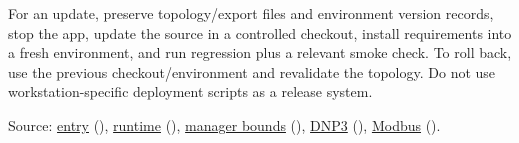 \par\noindent\begin{minipage}{\linewidth}\setlength{\parskip}{5pt}
For an update, preserve topology/export files and environment version records, stop the app, update the source in a controlled checkout, install requirements into a fresh environment, and run regression plus a relevant smoke check. To roll back, use the previous checkout/environment and revalidate the topology. Do not use workstation-specific deployment scripts as a release system.
{\footnotesize\color{muted}\raggedright Source: \href{https://github.com/neerajjayesh/GridSec-project/blob/main/main.py}{entry} (), \href{https://github.com/neerajjayesh/GridSec-project/blob/main/gui/main_window.py}{runtime} (), \href{https://github.com/neerajjayesh/GridSec-project/blob/main/core/integration_manager.py}{manager bounds} (), \href{https://github.com/neerajjayesh/GridSec-project/blob/main/core/dnp3_simulator.py}{DNP3} (), \href{https://github.com/neerajjayesh/GridSec-project/blob/main/core/modbus_simulator.py}{Modbus} ().\par}
\end{minipage}\par

